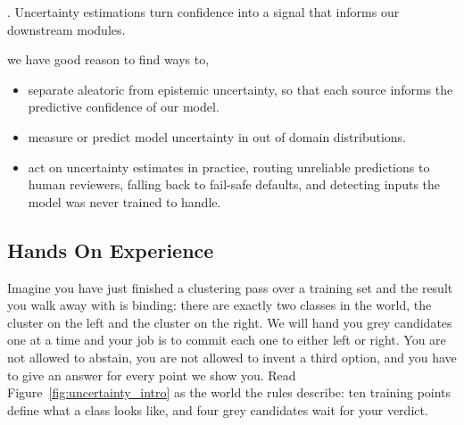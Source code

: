 . 
Uncertainty estimations turn confidence into a signal that informs our downstream modules.









 we have good reason to find ways to,
\begin{itemize}
    \item separate aleatoric from epistemic uncertainty, so that each source informs the predictive confidence of our model.
    \item measure or predict model uncertainty in out of domain distributions.
    \item act on uncertainty estimates in practice, routing unreliable predictions to human reviewers, falling back to fail-safe defaults, and detecting inputs the model was never trained to handle.
\end{itemize}




\newpage
\iffalse

\subsection{Hands On Experience}

Imagine you have just finished a clustering pass over a training set and the result you walk away with is binding: there are exactly two classes in the world, the cluster on the left and the cluster on the right.
We will hand you grey candidates one at a time and your job is to commit each one to either left or right.
You are not allowed to abstain, you are not allowed to invent a third option, and you have to give an answer for every point we show you.
Read Figure~\ref{fig:uncertainty_intro} as the world the rules describe: ten training points define what a class looks like, and four grey candidates wait for your verdict.

